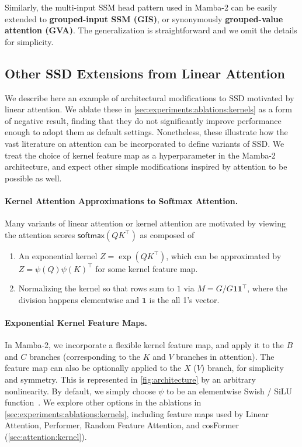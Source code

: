 \documentclass{article}
\newcommand{\citep}{\parencite}
\begin{document}
Similarly, the multi-input SSM head pattern used in Mamba-2 can be easily extended to \textbf{grouped-input SSM (GIS)}, or synonymously \textbf{grouped-value attention (GVA)}.
The generalization is straightforward and we omit the details for simplicity.

\subsection{Other SSD Extensions from Linear Attention}
\label{sec:architecture:kernels}

We describe here an example of architectural modifications to SSD motivated by linear attention.
We ablate these in \cref{sec:experiments:ablations:kernels} as a form of negative result,
finding that they do not significantly improve performance enough to adopt them as default settings.
Nonetheless, these illustrate how the vast literature on attention can be incorporated to
define variants of SSD.
We treat the choice of kernel feature map as a hyperparameter in the Mamba-2 architecture,
and expect other simple modifications inspired by attention to be possible as well.

\paragraph{Kernel Attention Approximations to Softmax Attention.}
Many variants of linear attention or kernel attention are motivated by viewing the attention scores $\mathsf{softmax}(QK^{\top})$ as composed of
\begin{enumerate}
  \item An exponential kernel $Z = \exp(QK^{\top})$, which can be approximated by $Z = \psi(Q)\psi(K)^{\top}$ for some kernel feature map.
  \item Normalizing the kernel so that rows sum to $1$ via $M = G / G \bm{1} \bm{1}^{\top}$, where the division happens elementwise and $\bm{1}$ is the all 1's vector.
\end{enumerate}

\paragraph{Exponential Kernel Feature Maps.}

In Mamba-2, we incorporate a flexible kernel feature map, and apply it to the $B$ and $C$ branches (corresponding to the $K$ and $V$ branches in attention).
The feature map can also be optionally applied to the $X$ ($V$) branch, for simplicity and symmetry.
This is represented in \cref{fig:architecture} by an arbitrary nonlinearity.
By default, we simply choose $\psi$ to be an elementwise Swish / SiLU function~\citep{hendrycks2016gaussian,ramachandran2017swish}.
We explore other options in the ablations in \cref{sec:experiments:ablations:kernels},
including feature maps used by Linear Attention, Performer, Random Feature Attention, and cosFormer (\cref{sec:attention:kernel}).
\end{document}
